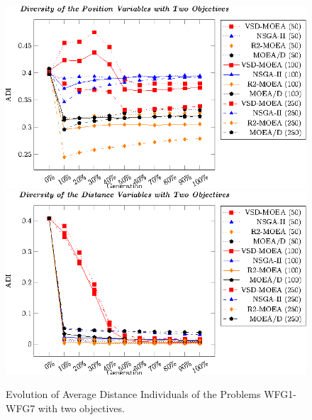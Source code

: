\begin{figure}[t]
\centering
%
\includegraphics[]{Images/Graphic-Diversity_2obj_tikz-figure0.eps} \\
\includegraphics[]{Images/Graphic-Diversity_2obj_tikz-figure1.eps}
\caption{Evolution of Average Distance Individuals of the Problems WFG1-WFG7 with two objectives.}\label{fig:Diversity_2obj}
\end{figure}

